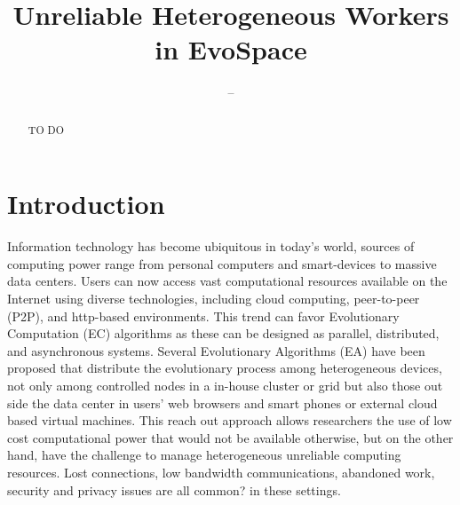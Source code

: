 \documentclass{llncs}
\begin{document}
\title{ Unreliable Heterogeneous Workers in EvoSpace }
%
%
\author{--}

\maketitle              %

\begin{abstract}
TO DO
\end{abstract}
%
\section{Introduction}
\label{sec:intro}
Information technology has become ubiquitous in today's world, sources of computing power range from personal computers and smart-devices to massive data centers. Users can now access vast computational resources available on the Internet using diverse technologies, including cloud computing, peer-to-peer (P2P), and http-based environments. This trend can favor Evolutionary Computation (EC) algorithms as these can be designed as parallel, distributed, and asynchronous systems.
Several Evolutionary Algorithms (EA) have been proposed that distribute the evolutionary process among heterogeneous devices, not only among controlled  nodes in a in-house cluster or grid but also those out side the data center in  users' web browsers and smart phones or external cloud based virtual machines. This reach out approach allows researchers the use of low cost computational power that would not be available otherwise, but on the other hand, have the challenge to manage heterogeneous unreliable computing resources. Lost connections, low bandwidth communications, abandoned work, security and privacy issues are all common? in these settings. 
\end{document}
